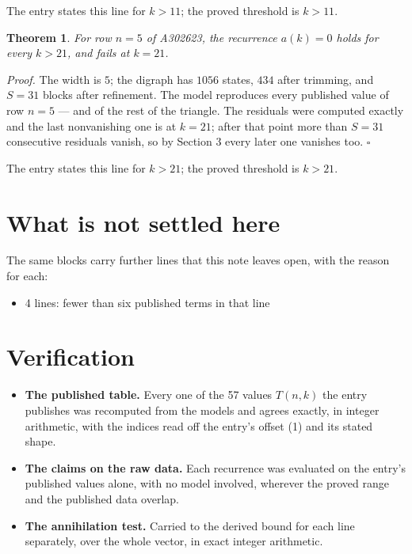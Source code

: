 \documentclass[11pt]{article}
\newtheorem{theorem}{Theorem}
\theoremstyle{definition}
\begin{document}
The entry states this line for $k > 11$; the proved threshold is $k > 11$.

\begin{theorem} For row $n = 5$ of A302623, the recurrence $a(k) = 0$ holds for every $k > 21$, and fails at $k = 21$.\end{theorem}

{\itshape Proof.} The width is $5$; the digraph has $1056$ states, $434$ after trimming, and $S = 31$ blocks after refinement. The model reproduces every published value of row $n = 5$ --- and of the rest of the triangle. The residuals were computed exactly and the last nonvanishing one is at $k = 21$; after that point more than $S = 31$ consecutive residuals vanish, so by Section 3 every later one vanishes too. $\square$

The entry states this line for $k > 21$; the proved threshold is $k > 21$.

\section{What is not settled here}

The same blocks carry further lines that this note leaves open, with the reason for each:

\begin{itemize}

\item 4 lines: fewer than six published terms in that line

\end{itemize}

\section{Verification}

\begin{itemize}

\item {\bfseries The published table.} Every one of the 57 values $T(n,k)$ the entry publishes was recomputed from the models and agrees exactly, in integer arithmetic, with the indices read off the entry's offset (1) and its stated shape.

\item {\bfseries The claims on the raw data.} Each recurrence was evaluated on the entry's published values alone, with no model involved, wherever the proved range and the published data overlap.

\item {\bfseries The annihilation test.} Carried to the derived bound for each line separately, over the whole vector, in exact integer arithmetic.

\end{itemize}
\end{document}
